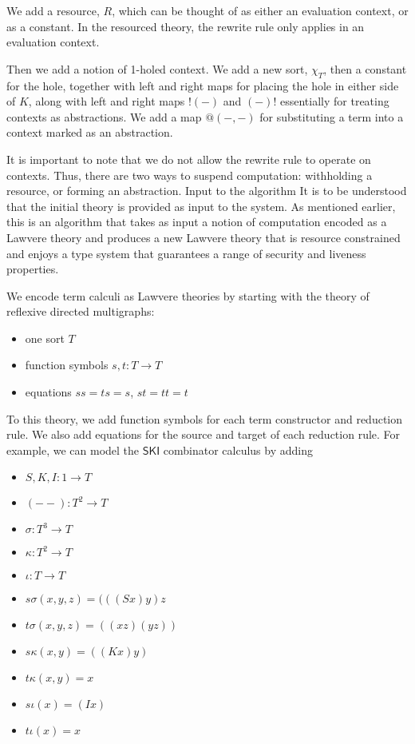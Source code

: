 \documentclass{llncs}
\renewcommand{\:}{\colon}
\begin{document}
We add a resource, $R$, which can be thought of as either an evaluation
context, or as a constant. In the resourced theory, the rewrite rule
only applies in an evaluation context.

Then we add a notion of 1-holed context. We add a new sort, $\chi_{T}$, then a
constant for the hole, together with left and right maps for placing
the hole in either side of $K$, along with left and right maps $!(-)$ and
$(-)!$ essentially for treating contexts as abstractions. We add a map
$@(-,-)$ for substituting a term into a context marked as an
abstraction.

It is important to note that we do not allow the rewrite rule to
operate on contexts. Thus, there are two ways to suspend computation:
withholding a resource, or forming an abstraction.  Input to the
algorithm It is to be understood that the initial theory is provided
as input to the system. As mentioned earlier, this is an algorithm
that takes as input a notion of computation encoded as a Lawvere
theory and produces a new Lawvere theory that is resource constrained
and enjoys a type system that guarantees a range of security and
liveness properties.

We encode term calculi as Lawvere theories by starting with the theory
of reflexive directed multigraphs:

\begin{itemize}
  \item one sort $T$
  \item function symbols $s, t: T \rightarrow T$
  \item equations $ss = ts = s$, $st = tt = t$
\end{itemize}

To this theory, we add function symbols for each term constructor and
reduction rule.  We also add equations for the source and target of
each reduction rule.  For example, we can model the $\mathsf{SKI}$ combinator
calculus by adding

\begin{itemize}
  \item $S, K, I : 1 \rightarrow T$
  \item $(- -) : T^{2} \rightarrow T$
  \item $\sigma : T^{3} \rightarrow T$
  \item $\kappa : T^{2} \rightarrow T$
  \item $\iota : T \rightarrow T$
  \item $s\sigma(x, y, z) = (((S x) y) z$
  \item $t\sigma(x, y, z) = ((x z) (y z))$
  \item $s\kappa(x, y) = ((K x) y)$
  \item $t\kappa(x, y) = x$
  \item $s\iota(x) = (I x)$
  \item $t\iota(x) = x$
\end{itemize}
\end{document}
